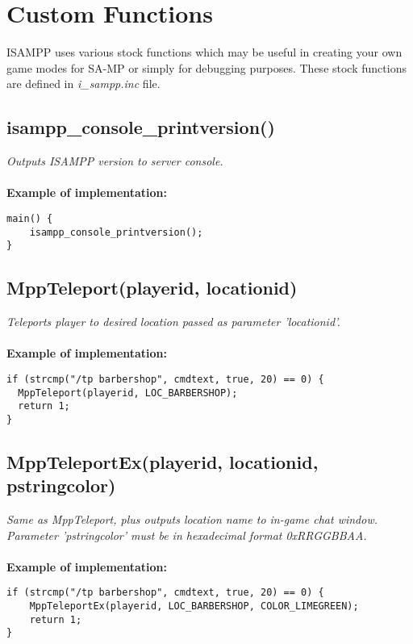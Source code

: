 \documentclass{article}
\begin{document}
\newpage
\section{Custom Functions}

ISAMPP uses various stock functions which may be useful in creating your own game modes for SA-MP or simply for debugging purposes. These stock functions are defined in \textit{i\_sampp.inc} file.
\\
\subsection{isampp\_console\_printversion()}

\textit{Outputs ISAMPP version to server console.}
\\
\\
\textbf{Example of implementation:}
\begin{verbatim}
main() {
    isampp_console_printversion();
}
\end{verbatim}



\subsection{MppTeleport(playerid, locationid)}

\textit{Teleports player to desired location passed as parameter 'locationid'.}
\\
\\
\textbf{Example of implementation:}
\begin{verbatim}
if (strcmp("/tp barbershop", cmdtext, true, 20) == 0) {
  MppTeleport(playerid, LOC_BARBERSHOP);
  return 1;
}
\end{verbatim}


\subsection{MppTeleportEx(playerid, locationid, pstringcolor)}

\textit{Same as MppTeleport, plus outputs location name to in-game chat window. \\Parameter 'pstringcolor' must be in hexadecimal format 0xRRGGBBAA.}
\\
\\
\textbf{Example of implementation:}
\begin{verbatim}
if (strcmp("/tp barbershop", cmdtext, true, 20) == 0) {
    MppTeleportEx(playerid, LOC_BARBERSHOP, COLOR_LIMEGREEN);
    return 1;
}
\end{verbatim}
\end{document}
